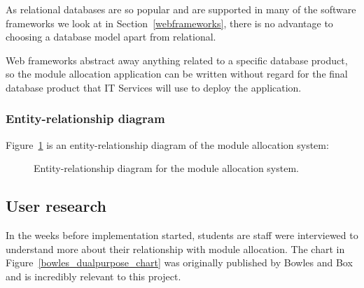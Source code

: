 \documentclass[]{scrartcl}
\begin{document}
As relational databases are so popular and are supported in many of the
software frameworks we look at in Section~\ref{webframeworks}, there is no
advantage to choosing a database model apart from relational.

Web frameworks abstract away anything related to a specific database product,
so the module allocation application can be written without regard for the
final database product that IT Services will use to deploy the application.

\subsubsection{Entity-relationship diagram}


Figure~\ref{er_diagram} is an entity-relationship diagram of the module
allocation system:

\begin{figure}
  \caption{Entity-relationship diagram for the module allocation system.}
  \label{er_diagram}
\end{figure}

\subsection{User research}

In the weeks before implementation started, students are staff were
interviewed to understand more about their relationship with module
allocation. The chart in Figure~\ref{bowles_dualpurpose_chart} was originally
published by Bowles and Box and is incredibly relevant to this project.
\end{document}
